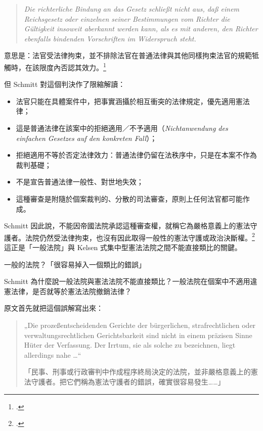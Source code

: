 \begin{quote}
\emph{Die richterliche Bindung an das Gesetz schließt nicht aus, daß einem Reichsgesetz oder einzelnen seiner Bestimmungen vom Richter die Gültigkeit insoweit aberkannt werden kann, als es mit anderen, den Richter ebenfalls bindenden Vorschriften im Widerspruch steht.}
\end{quote}

意思是：法官受法律拘束，並不排除法官在普通法律與其他同樣拘束法官的規範牴觸時，在該限度內否認其效力。\footcites[82]{schmitt2015}[15]{schmitt1931}

但 Schmitt 對這個判決作了限縮解讀：

\begin{itemize}
\tightlist
\item
  法官只能在具體案件中，把事實涵攝於相互衝突的法律規定，優先適用憲法律；
\item
  這是普通法律在該案中的拒絕適用／不予適用（\emph{Nichtanwendung des einfachen Gesetzes auf den konkreten Fall}）；
\item
  拒絕適用不等於否定法律效力：普通法律仍留在法秩序中，只是在本案不作為裁判基礎；
\item
  不是宣告普通法律一般性、對世地失效；
\item
  這種審查是附隨於個案裁判的、分散的司法審查，原則上任何法官都可能作成。
\end{itemize}

Schmitt 因此說，不能因帝國法院承認這種審查權，就稱它為嚴格意義上的憲法守護者。法院仍然受法律拘束，也沒有因此取得一般性的憲法守護或政治決斷權。\footcites[82--84, 88--90]{schmitt2015}[12, 16, 20--22]{schmitt1931}這正是「一般法院」與 Kelsen 式集中型憲法法院之間不能直接類比的關鍵。


\begin{qaprompt}
一般的法院？「很容易掉入一個類比的錯誤」
\end{qaprompt}

\begin{qaquestion}
Schmitt 為什麼說一般法院與憲法法院不能直接類比？一般法院在個案中不適用違憲法律，是否就等於憲法法院撤銷法律？
\end{qaquestion}

原文首先就把這個誤解寫出來：

\begin{quote}
„Die prozeßentscheidenden Gerichte der bürgerlichen, strafrechtlichen oder verwaltungsrechtlichen Gerichtsbarkeit sind nicht in einem präzisen Sinne Hüter der Verfassung. Der Irrtum, sie als solche zu bezeichnen, liegt allerdings nahe \ldots``

「民事、刑事或行政審判中作成程序終局決定的法院，並非嚴格意義上的憲法守護者。把它們稱為憲法守護者的錯誤，確實很容易發生\ldots\ldots」
\end{quote}

